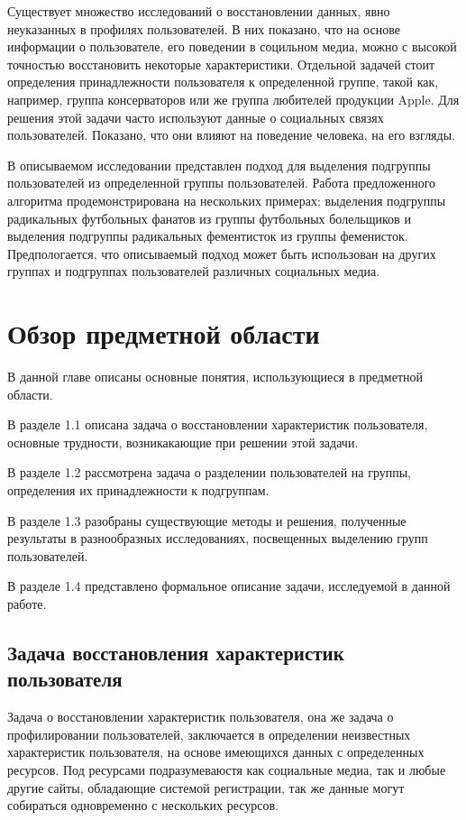 \documentclass[annotation,times,page4]{itmo-student-thesis}
\begin{document}
Существует множество исследований о восстановлении данных, явно неуказанных в профилях пользователей\cite{blachnio2015facebook, schwartz2013personality, turdakov2013opredelenie, peersman2011predicting}. В них показано, что на основе информации о пользователе, его поведении в социльном медиа, можно с высокой точностью восстановить некоторые характеристики. 
Отдельной задачей стоит определения принадлежности пользователя к определенной группе, такой как, например, группа консерваторов или же группа любителей продукции Apple. Для решения  этой задачи часто используют данные о социальных связях пользователей. Показано, что они влияют на поведение человека, на его взгляды\cite{trusov2010determining, bond201261}. 

В описываемом исследовании представлен подход для выделения подгруппы пользователей из определенной группы пользователей. Работа предложенного алгоритма продемонстрирована на нескольких примерах: выделения подгруппы радикальных футбольных фанатов из группы футбольных болельщиков и выделения подгруппы радикальных фементисток из группы феменисток. Предпологается, что описываемый подход может быть использован на других группах и подгруппах пользователей различных социальных медиа.

\chapter{Обзор предметной области}
В данной главе описаны основные понятия, использующиеся в предметной области.

В разделе 1.1 описана задача о восстановлении характеристик пользователя, основные трудности, возникакающие при решении этой задачи. 

В разделе 1.2 рассмотрена задача о разделении пользователей на группы, определения их принадлежности к подгруппам.

В разделе 1.3 разобраны существующие методы и решения, полученные результаты в разнообразных исследованиях, посвещенных выделению групп пользователей.

В разделе 1.4 представлено формальное описание задачи, исследуемой в данной работе.

\section{Задача восстановления характеристик пользователя}
Задача о восстановлении характеристик пользователя, она же задача о профилировании пользователей, заключается в определении неизвестных характеристик пользователя, на основе имеющихся данных с определенных ресурсов. Под ресурсами подразумеваюстя как социальные медиа, так и любые другие сайты, обладающие системой регистрации, так же данные могут собираться одновременно с нескольких ресурсов.
\end{document}
